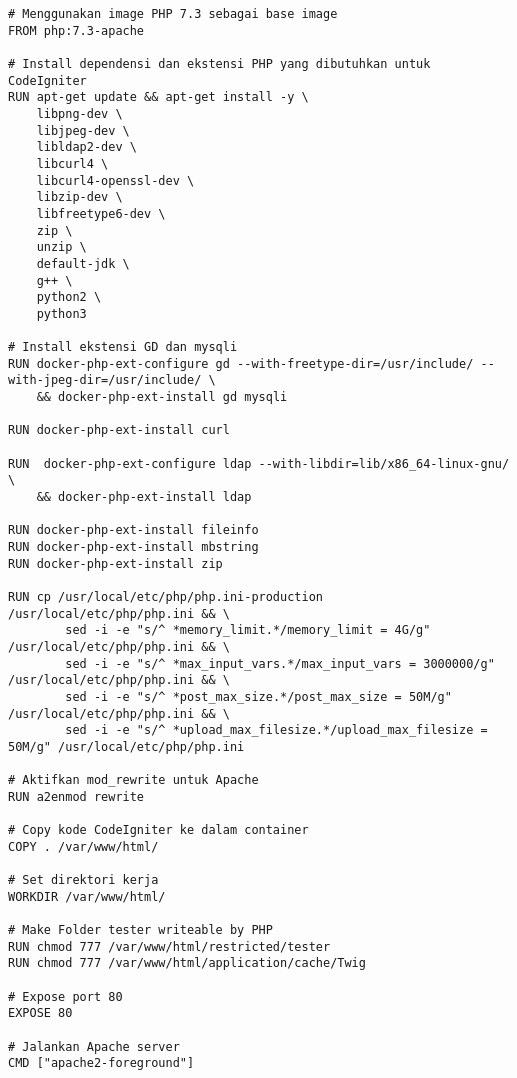 \begin{lstlisting}[language=docker, caption=File \textit{Dockerfile} yang digunakan untuk Experiment, label=kode:5:3:1:dockerfile]
# Menggunakan image PHP 7.3 sebagai base image
FROM php:7.3-apache

# Install dependensi dan ekstensi PHP yang dibutuhkan untuk CodeIgniter
RUN apt-get update && apt-get install -y \
    libpng-dev \
    libjpeg-dev \
	libldap2-dev \
	libcurl4 \
    libcurl4-openssl-dev \
	libzip-dev \
    libfreetype6-dev \
    zip \
    unzip \
	default-jdk \
	g++ \
	python2 \
	python3

# Install ekstensi GD dan mysqli
RUN docker-php-ext-configure gd --with-freetype-dir=/usr/include/ --with-jpeg-dir=/usr/include/ \
    && docker-php-ext-install gd mysqli
	
RUN docker-php-ext-install curl

RUN  docker-php-ext-configure ldap --with-libdir=lib/x86_64-linux-gnu/ \
	&& docker-php-ext-install ldap

RUN docker-php-ext-install fileinfo
RUN docker-php-ext-install mbstring
RUN docker-php-ext-install zip

RUN cp /usr/local/etc/php/php.ini-production /usr/local/etc/php/php.ini && \
        sed -i -e "s/^ *memory_limit.*/memory_limit = 4G/g" /usr/local/etc/php/php.ini && \
        sed -i -e "s/^ *max_input_vars.*/max_input_vars = 3000000/g" /usr/local/etc/php/php.ini && \
        sed -i -e "s/^ *post_max_size.*/post_max_size = 50M/g" /usr/local/etc/php/php.ini && \
        sed -i -e "s/^ *upload_max_filesize.*/upload_max_filesize = 50M/g" /usr/local/etc/php/php.ini

# Aktifkan mod_rewrite untuk Apache
RUN a2enmod rewrite

# Copy kode CodeIgniter ke dalam container
COPY . /var/www/html/

# Set direktori kerja
WORKDIR /var/www/html/

# Make Folder tester writeable by PHP
RUN chmod 777 /var/www/html/restricted/tester
RUN chmod 777 /var/www/html/application/cache/Twig

# Expose port 80
EXPOSE 80

# Jalankan Apache server
CMD ["apache2-foreground"]
\end{lstlisting}

%  

